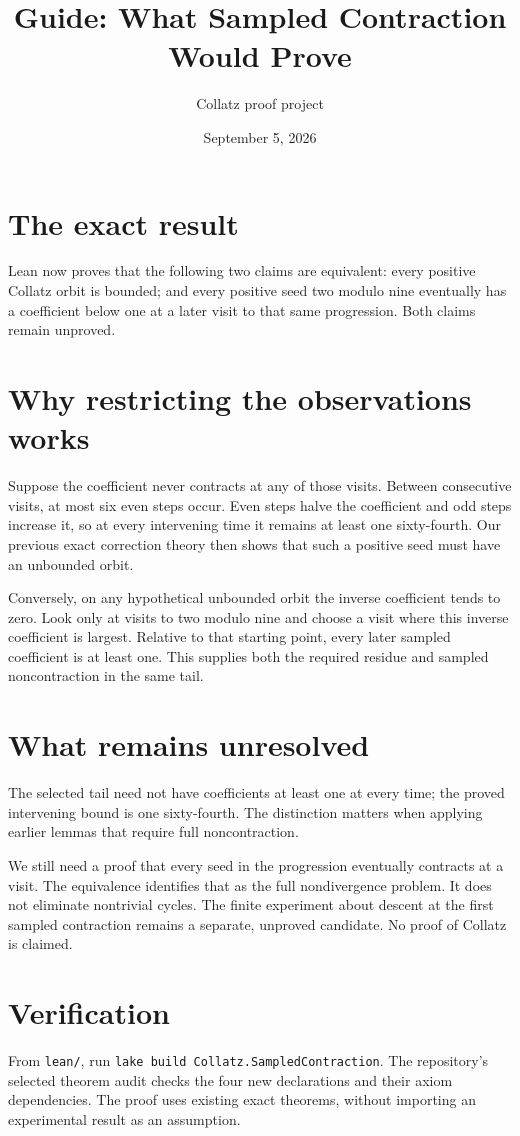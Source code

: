 \documentclass[10pt]{article}
\title{Guide: What Sampled Contraction Would Prove}
\author{Collatz proof project}
\date{September 5, 2026}
\begin{document}
\maketitle
\raggedright
\section*{The exact result}
Lean now proves that the following two claims are equivalent: every
positive Collatz orbit is bounded; and every positive seed two modulo
nine eventually has a coefficient below one at a later visit to that
same progression. Both claims remain unproved.

\section*{Why restricting the observations works}
Suppose the coefficient never contracts at any of those visits.
Between consecutive visits, at most six even steps occur. Even steps
halve the coefficient and odd steps increase it, so at every intervening
time it remains at least one sixty-fourth. Our previous exact correction
theory then shows that such a positive seed must have an unbounded orbit.

Conversely, on any hypothetical unbounded orbit the inverse coefficient
tends to zero. Look only at visits to two modulo nine and choose a visit
where this inverse coefficient is largest. Relative to that starting
point, every later sampled coefficient is at least one. This supplies
both the required residue and sampled noncontraction in the same tail.

\section*{What remains unresolved}
The selected tail need not have coefficients at least one at every time;
the proved intervening bound is one sixty-fourth. The distinction matters
when applying earlier lemmas that require full noncontraction.

We still need a proof that every seed in the progression eventually
contracts at a visit. The equivalence identifies that as the full
nondivergence problem. It does not eliminate nontrivial cycles.
The finite experiment about descent at the first sampled contraction
remains a separate, unproved candidate. No proof of Collatz is claimed.

\section*{Verification}
From \texttt{lean/}, run
\texttt{lake build Collatz.SampledContraction}.
The repository's selected theorem audit checks the four new declarations
and their axiom dependencies. The proof uses existing exact theorems,
without importing an experimental result as an assumption.
\end{document}
